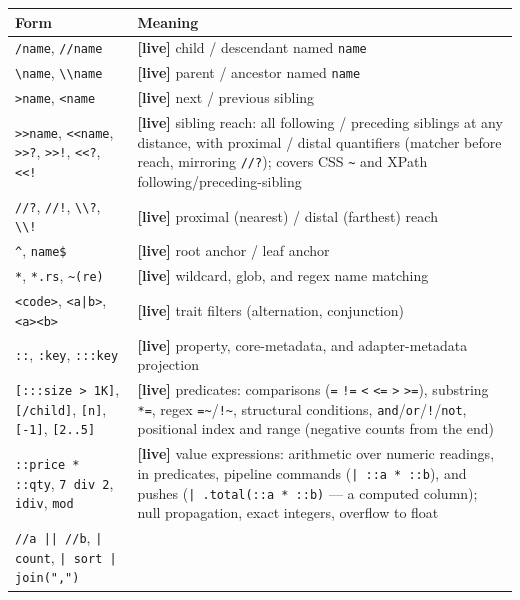 \documentclass{report}
\newcommand{\live}{\textbf{\textcolor{blue!60!black}{[live]}}\xspace}
\begin{document}
\begin{xltabular}{\textwidth}{>{\raggedright\arraybackslash}p{0.36\textwidth} X}
\toprule
\textbf{Form} & \textbf{Meaning} \\
\midrule
\texttt{/name}, \texttt{//name} & \live child / descendant named \texttt{name} \\
\texttt{\textbackslash name}, \texttt{\textbackslash\textbackslash name}
  & \live parent / ancestor named \texttt{name} \\
\texttt{>name}, \texttt{<name} & \live next / previous sibling \\
\texttt{>>name}, \texttt{<<name}, \texttt{>>?}, \texttt{>>!},
\texttt{<<?}, \texttt{<<!}
  & \live sibling reach: all following / preceding siblings at any
    distance, with proximal / distal quantifiers (matcher before
    reach, mirroring \texttt{//?}); covers CSS \texttt{\textasciitilde}
    and XPath following/preceding-sibling \\
\texttt{//?}, \texttt{//!}, \texttt{\textbackslash\textbackslash?}, \texttt{\textbackslash\textbackslash!}
  & \live proximal (nearest) / distal (farthest) reach \\
\texttt{\textasciicircum}, \texttt{name\$} & \live root anchor / leaf anchor \\
\texttt{*}, \texttt{*.rs}, \texttt{\textasciitilde(re)}
  & \live wildcard, glob, and regex name matching \\
\texttt{<code>}, \texttt{<a|b>}, \texttt{<a><b>}
  & \live trait filters (alternation, conjunction) \\
\texttt{::}, \texttt{:key}, \texttt{:::key}
  & \live property, core-metadata, and adapter-metadata projection \\
\texttt{[:::size > 1K]}, \texttt{[/child]}, \texttt{[n]},
\texttt{[-1]}, \texttt{[2..5]}
  & \live predicates: comparisons (\texttt{=} \texttt{!=} \texttt{<}
    \texttt{<=} \texttt{>} \texttt{>=}), substring \texttt{*=}, regex
    \texttt{=\textasciitilde}/\texttt{!\textasciitilde}, structural
    conditions, \texttt{and}/\texttt{or}/\texttt{!}/\texttt{not},
    positional index and range (negative counts from the end) \\
\texttt{::price * ::qty}, \texttt{7 div 2}, \texttt{idiv}, \texttt{mod}
  & \live value expressions: arithmetic over numeric readings, in
    predicates, pipeline commands (\texttt{| ::a * ::b}), and pushes
    (\texttt{| .total(::a * ::b)} — a computed column); null
    propagation, exact integers, overflow to float \\
\texttt{//a || //b}, \texttt{| count}, \texttt{| sort | join(",")}

\end{xltabular}
\end{document}
